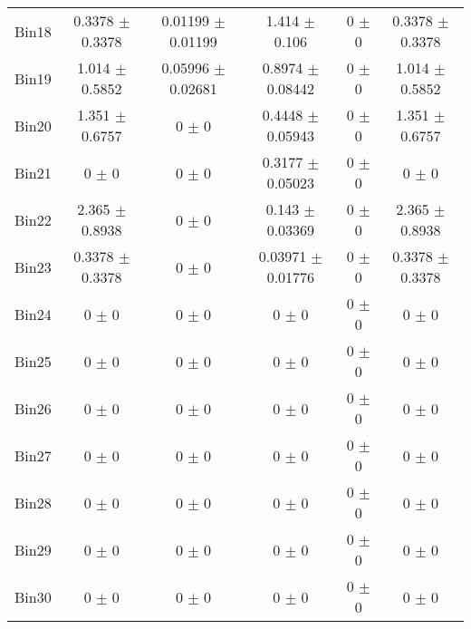\begin{tabular}{@{\extracolsep{4pt}}lccccc@{}}
     Bin18 & 0.3378 $\pm$ 0.3378 & 0.01199 $\pm$ 0.01199 & 1.414 $\pm$ 0.106 & 0 $\pm$ 0 & 0.3378 $\pm$ 0.3378 \\ 
     Bin19 & 1.014 $\pm$ 0.5852 & 0.05996 $\pm$ 0.02681 & 0.8974 $\pm$ 0.08442 & 0 $\pm$ 0 & 1.014 $\pm$ 0.5852 \\ 
     Bin20 & 1.351 $\pm$ 0.6757 & 0 $\pm$ 0 & 0.4448 $\pm$ 0.05943 & 0 $\pm$ 0 & 1.351 $\pm$ 0.6757 \\ 
     Bin21 & 0 $\pm$ 0 & 0 $\pm$ 0 & 0.3177 $\pm$ 0.05023 & 0 $\pm$ 0 & 0 $\pm$ 0 \\ 
     Bin22 & 2.365 $\pm$ 0.8938 & 0 $\pm$ 0 & 0.143 $\pm$ 0.03369 & 0 $\pm$ 0 & 2.365 $\pm$ 0.8938 \\ 
     Bin23 & 0.3378 $\pm$ 0.3378 & 0 $\pm$ 0 & 0.03971 $\pm$ 0.01776 & 0 $\pm$ 0 & 0.3378 $\pm$ 0.3378 \\ 
     Bin24 & 0 $\pm$ 0 & 0 $\pm$ 0 & 0 $\pm$ 0 & 0 $\pm$ 0 & 0 $\pm$ 0 \\ 
     Bin25 & 0 $\pm$ 0 & 0 $\pm$ 0 & 0 $\pm$ 0 & 0 $\pm$ 0 & 0 $\pm$ 0 \\ 
     Bin26 & 0 $\pm$ 0 & 0 $\pm$ 0 & 0 $\pm$ 0 & 0 $\pm$ 0 & 0 $\pm$ 0 \\ 
     Bin27 & 0 $\pm$ 0 & 0 $\pm$ 0 & 0 $\pm$ 0 & 0 $\pm$ 0 & 0 $\pm$ 0 \\ 
     Bin28 & 0 $\pm$ 0 & 0 $\pm$ 0 & 0 $\pm$ 0 & 0 $\pm$ 0 & 0 $\pm$ 0 \\ 
     Bin29 & 0 $\pm$ 0 & 0 $\pm$ 0 & 0 $\pm$ 0 & 0 $\pm$ 0 & 0 $\pm$ 0 \\ 
     Bin30 & 0 $\pm$ 0 & 0 $\pm$ 0 & 0 $\pm$ 0 & 0 $\pm$ 0 & 0 $\pm$ 0 \\ 
\hline\hline
  \end{tabular}

